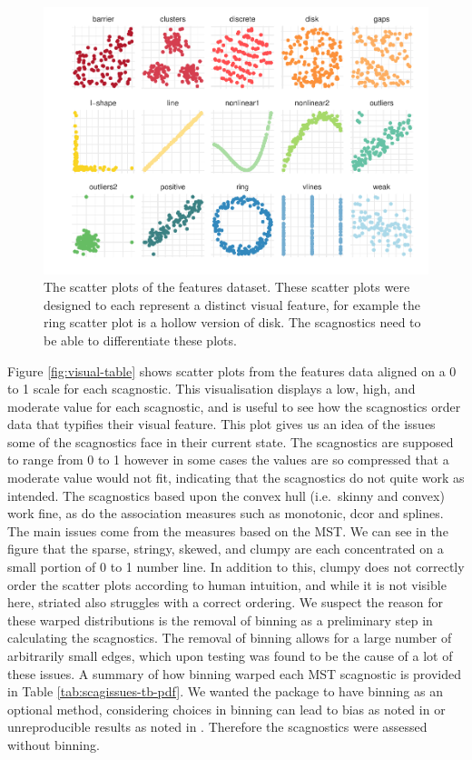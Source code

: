 \begin{Schunk}
\begin{figure}
\includegraphics[width=1\linewidth]{mason-lee-laa-cook_files/figure-latex/features-plot-1} \caption[The scatter plots of the features dataset]{The scatter plots of the features dataset. These scatter plots were designed to each represent a distinct visual feature, for example the ring scatter plot is a hollow version of disk. The scagnostics need to be able to differentiate these plots.}\label{fig:features-plot}
\end{figure}
\end{Schunk}

Figure \ref{fig:visual-table} shows scatter plots from the features data
aligned on a 0 to 1 scale for each scagnostic. This visualisation
displays a low, high, and moderate value for each scagnostic, and is
useful to see how the scagnostics order data that typifies their visual
feature. This plot gives us an idea of the issues some of the
scagnostics face in their current state. The scagnostics are supposed to
range from 0 to 1 however in some cases the values are so compressed
that a moderate value would not fit, indicating that the scagnostics do
not quite work as intended. The scagnostics based upon the convex hull
(i.e.~skinny and convex) work fine, as do the association measures such
as monotonic, dcor and splines. The main issues come from the measures
based on the MST. We can see in the figure that the sparse, stringy,
skewed, and clumpy are each concentrated on a small portion of 0 to 1
number line. In addition to this, clumpy does not correctly order the
scatter plots according to human intuition, and while it is not visible
here, striated also struggles with a correct ordering. We suspect the
reason for these warped distributions is the removal of binning as a
preliminary step in calculating the scagnostics. The removal of binning
allows for a large number of arbitrarily small edges, which upon testing
was found to be the cause of a lot of these issues. A summary of how
binning warped each MST scagnostic is provided in Table
\ref{tab:scagissues-tb-pdf}. We wanted the package to have binning as an
optional method, considering choices in binning can lead to bias as
noted in \citet{scagdist} or unreproducible results as noted in
\citet{robust}. Therefore the scagnostics were assessed without binning.

